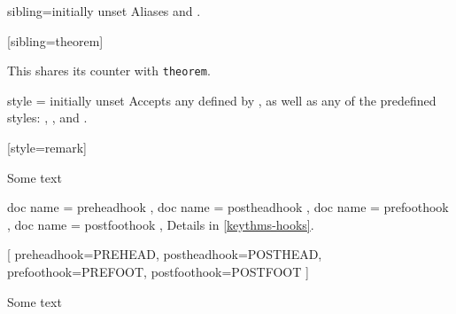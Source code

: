 \documentclass{ltxdoc}
\begin{document}
\begin{docKey}{sibling}{=}{initially unset}
Aliases  and .

\begin{tcbwritetemp}
[sibling=theorem]
\end{tcbwritetemp}

\begin{keythmscode}[withpreamble]
\begin{lemma}
This shares its counter with
\texttt{theorem}.
\end{lemma}
\end{keythmscode}

\end{docKey}

\begin{docKey}{style}
  {=}
  {initially unset}
Accepts any  defined by , as well as any of the predefined  styles: , , and .

\begin{tcbwritetemp}
[style=remark]
\end{tcbwritetemp}

\begin{keythmscode}[withpreamble]
\begin{remark}
Some text
\end{remark}
\end{keythmscode}

\end{docKey}

\begin{docKeys}[
  doc parameter = {=\meta{code}},
  doc description = initially unset,
  ]
  {
    { doc name = preheadhook },
    { doc name = postheadhook },
    { doc name = prefoothook },
    { doc name = postfoothook },
  }
Details in \autoref{keythms-hooks}.

\begin{tcbwritetemp}
[
  preheadhook=PREHEAD,
  postheadhook=POSTHEAD,
  prefoothook=PREFOOT,
  postfoothook=POSTFOOT
]
\end{tcbwritetemp}

\begin{keythmscode}[withpreamble]
\begin{test}
Some text
\end{test}
\end{keythmscode}

\end{docKeys}
\end{document}
